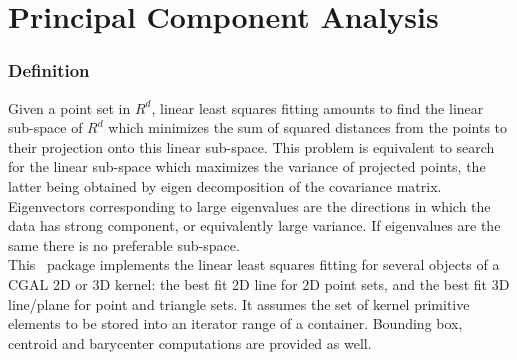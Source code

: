 
\chapter{Principal Component Analysis}
\label{ref_chapter_pca}


\subsection*{Definition}

Given a point set in $R^d$, linear least squares fitting amounts to
find the linear sub-space of $R^d$ which minimizes the sum of squared
distances from the points to their projection onto this linear
sub-space. This problem is equivalent to search for the linear
sub-space which maximizes the variance of projected points, the latter
being obtained by eigen decomposition of the covariance
matrix. Eigenvectors corresponding to large eigenvalues are the
directions in which the data has strong component, or equivalently
large variance. If eigenvalues are the same there is no preferable
sub-space.\\

This \cgal\ package implements the linear least squares fitting for
several objects of a CGAL 2D or 3D kernel: the best fit 2D line for 2D
point sets, and the best fit 3D line/plane for point and
triangle sets. It assumes the set of kernel primitive elements to be stored into an
iterator range of a container. Bounding box, centroid and barycenter
computations are provided as well. 




\\
\\
\\
\\
\clearpage

